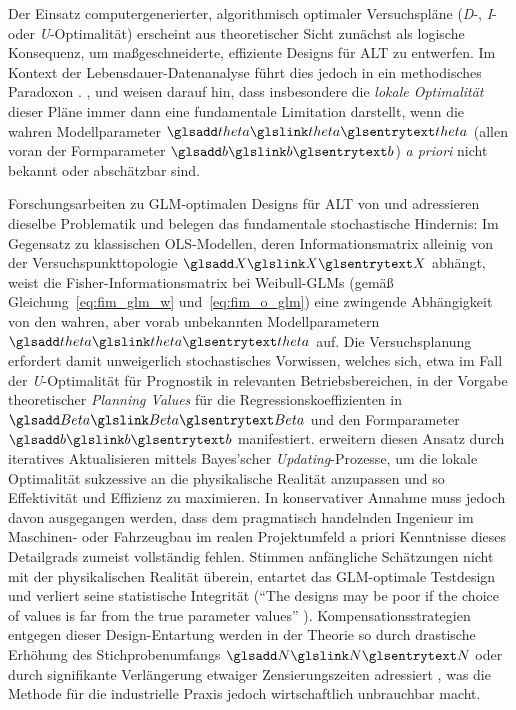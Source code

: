 Der Einsatz computergenerierter, algorithmisch optimaler Versuchspläne (\textit{D}-, \textit{I}- oder \textit{U}-Optimalität) erscheint aus theoretischer Sicht zunächst als logische Konsequenz, um maßgeschneiderte, effiziente Designs für \ac{ALT} zu entwerfen.
Im Kontext der Lebensdauer-Datenanalyse führt dies jedoch in ein methodisches Paradoxon \cite{Goos.2011}.
\textcite{Khuri.2006}, \textcite{Stufken.2012} und \textcite{Yang.2011} weisen darauf hin, dass insbesondere die \textit{lokale Optimalität} dieser Pläne immer dann eine fundamentale Limitation darstellt, wenn die wahren Modellparameter $\sym{theta}$ (allen voran der Formparameter $\sym{b}$) \textit{a priori} nicht bekannt oder abschätzbar sind.

Forschungsarbeiten zu \ac{GLM}-optimalen Designs für \ac{ALT} von \textcite{Monroe.2010} und \textcite{Seo.2015} adressieren dieselbe Problematik und belegen das fundamentale stochastische Hindernis: Im Gegensatz zu klassischen \ac{OLS}-Modellen, deren Informationsmatrix alleinig von der Versuchspunkttopologie $\sym{X}$ abhängt, weist die Fisher-Informationsmatrix bei Weibull-\acp{GLM} (gemäß Gleichung~\ref{eq:fim_glm_w} und~\ref{eq:fim_o_glm}) eine zwingende Abhängigkeit von den wahren, aber vorab unbekannten Modellparametern $\sym{theta}$ auf.
Die Versuchsplanung erfordert damit unweigerlich stochastisches Vorwissen, welches sich, etwa im Fall der \textit{U}-Optimalität für Prognostik in relevanten Betriebsbereichen, in der Vorgabe theoretischer \textit{Planning Values} für die Regressionskoeffizienten in $\sym{Beta}$ und den Formparameter $\sym{b}$ manifestiert.
\textcite{Monroe.2011} erweitern diesen Ansatz durch iteratives Aktualisieren mittels Bayes'scher \textit{Updating}-Prozesse, um die lokale Optimalität sukzessive an die physikalische Realität anzupassen und so Effektivität und Effizienz zu maximieren.
In konservativer Annahme muss jedoch davon ausgegangen werden, dass dem pragmatisch handelnden Ingenieur im Maschinen- oder Fahrzeugbau im realen Projektumfeld a priori Kenntnisse dieses Detailgrads zumeist vollständig fehlen.
Stimmen anfängliche Schätzungen nicht mit der physikalischen Realität überein, entartet das \ac{GLM}-optimale Testdesign und verliert seine statistische Integrität (\enquote{The designs may be poor if the choice of values is far from the true parameter values} \textcite[S.\,2]{Stufken.2012}).
Kompensationsstrategien entgegen dieser Design-Entartung werden in der Theorie so durch drastische Erhöhung des Stichprobenumfangs $\sym{N}$ oder durch signifikante Verlängerung etwaiger Zensierungszeiten adressiert \cite{Monroe.2010}, was die Methode für die industrielle Praxis jedoch wirtschaftlich unbrauchbar macht.

